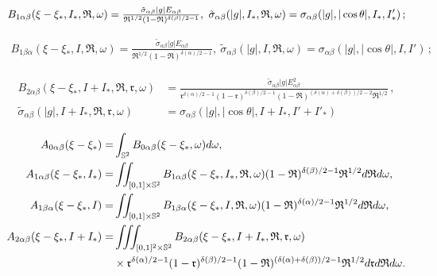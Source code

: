 \documentclass[10pt,a4paper]{amsart}
\begin{document}
    \begin{equation}\label{B1-ab}{\small
        \begin{aligned}
            B_{1\alpha \beta }(\xi-\xi_*,I_*,\mathfrak{R},\omega )  = \tfrac{\tilde{\sigma}_{\alpha \beta }|g|E_{\alpha \beta }}{\mathfrak{R}^{1/2} (1-\mathfrak{R})^{\delta(\beta)/2-1}},\  \tilde{\sigma}_{\alpha \beta } (|g|,I_* ,\mathfrak{R},\omega )=\sigma_{\alpha \beta }(|g|,|\cos \theta|,I_*,I'_*) \,;
        \end{aligned}}
    \end{equation}

    \begin{equation}\label{B1-ba}
        \begin{aligned}
            B_{1 \beta \alpha }(\xi-\xi_*,I,\mathfrak{R},\omega )  = \tfrac{\tilde{\sigma}_{\alpha \beta }|g|E_{\alpha \beta }}{\mathfrak{R}^{1/2} (1-\mathfrak{R})^{\delta(\alpha)/2-1}},\  \tilde{\sigma}_{\alpha \beta } (|g|,I ,\mathfrak{R},\omega )=\sigma_{\alpha \beta }(|g|,|\cos \theta|,I,I') \,;
        \end{aligned}
    \end{equation}

    \begin{equation}\label{B2-ab}
        \begin{aligned}
            B_{2\alpha \beta }(\xi-\xi_*,I+I_*,\mathfrak{R},\mathfrak{r},\omega)&= \tfrac{\tilde{\sigma}_{\alpha \beta } |g|E^2_{\alpha \beta }}{\mathfrak{r}^{\delta(\alpha)/2-1} (1-\mathfrak{r})^{\delta (\beta )/2-1 }(1-\mathfrak{R} ) ^{(\delta (\alpha) +\delta (\beta ))/2-2} \mathfrak{R}^{1/2} } \,,\\
            \tilde{\sigma}_{\alpha \beta } (|g|,I+I_*,\mathfrak{R},\mathfrak{r},\omega) &= \sigma_{\alpha \beta } (|g|,|\cos \theta|,I+I_*,I'+I'_*) 
        \end{aligned}
    \end{equation}

\begin{equation}\label{A}{\small
    \begin{aligned}
		A_{0 \alpha \beta } (\xi-\xi_*)=&\int_{\mathbb{S}^2 } B_{0 \alpha \beta }(\xi-\xi_*,\omega ) d\omega, \\
		A_{1\alpha \beta }(\xi-\xi_*,I_*)= &\iint_{[0,1] \times \mathbb{S}^2 } B_{1 \alpha \beta } (\xi-\xi_*,I_*,\mathfrak{R}, \omega )(1-\mathfrak{R})^{\delta(\beta )/2-1}\mathfrak{R}^{1/2} d\mathfrak{R}d\omega, \\
		A_{1 \beta \alpha }(\xi-\xi_*,I)=&\iint_{[0,1] \times \mathbb{S}^2 } B_{1 \beta \alpha }(\xi-\xi_*,I,\mathfrak{R},\omega) (1-\mathfrak{R})^{\delta(\alpha )/2-1}\mathfrak{R}^{1/2} d\mathfrak{R}d\omega, \\
		A_{2\alpha \beta } (\xi-\xi_*,I+I_*)=&\iiint_{[0,1]^2 \times \mathbb{S}^2 } B_{2\alpha \beta }(\xi-\xi_*,I+I_*,\mathfrak{R},\mathfrak{r},\omega ) \\
     & \times \mathfrak{r}^{\delta(\alpha )/2-1} (1-\mathfrak{r})^{\delta(\beta )/2-1} (1-\mathfrak{R})^{(\delta(\alpha)+\delta (\beta ))/2-1} \mathfrak{R}^{1/2} d\mathfrak{r}d\mathfrak{R}d\omega .
    \end{aligned}}
\end{equation}
\end{document}
